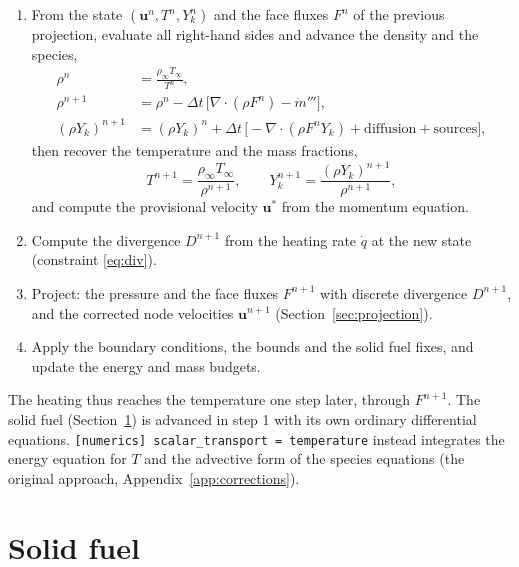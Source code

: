 \documentclass[11pt,a4paper]{article}
\newcommand{\vu}{\mathbf{u}}
\newcommand{\code}[1]{\texttt{#1}}
\begin{document}
\begin{enumerate}
  \item From the state $(\vu^n, T^n, Y_k^n)$ and the face fluxes $F^n$ of the previous projection,
        evaluate all right-hand sides and advance the density and the species,
        \begin{align*}
          \rho^n &= \frac{\rho_\infty T_\infty}{T^n},\\[4pt]
          \rho^{n+1} &= \rho^n - \Delta t\,\big[\nabla\cdot(\rho F^n) - \dot m'''\big],\\[4pt]
          (\rho Y_k)^{n+1} &= (\rho Y_k)^n + \Delta t\,\big[-\nabla\cdot(\rho F^n Y_k) + \text{diffusion} + \text{sources}\big],
        \end{align*}
        then recover the temperature and the mass fractions,
        \[
          T^{n+1} = \frac{\rho_\infty T_\infty}{\rho^{n+1}},\qquad
          Y_k^{n+1} = \frac{(\rho Y_k)^{n+1}}{\rho^{n+1}},
        \]
        and compute the provisional velocity $\vu^*$ from the momentum equation.
  \item Compute the divergence $D^{n+1}$ from the heating rate $\dot q$ at the new state
        (constraint \eqref{eq:div}).
  \item Project: the pressure and the face fluxes $F^{n+1}$ with discrete divergence $D^{n+1}$, and the
        corrected node velocities $\vu^{n+1}$ (Section~\ref{sec:projection}).
  \item Apply the boundary conditions, the bounds and the solid fuel fixes, and update the energy and
        mass budgets.
\end{enumerate}
The heating thus reaches the temperature one step later, through $F^{n+1}$. The solid fuel
(Section~\ref{sec:solid}) is advanced in step 1 with its own ordinary differential equations.
\code{[numerics] scalar\_transport = temperature} instead integrates the energy equation for $T$ and
the advective form of the species equations (the original approach, Appendix~\ref{app:corrections}).

\section{Solid fuel}\label{sec:solid}
\end{document}
